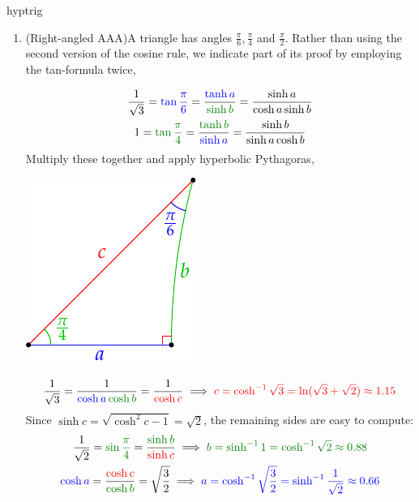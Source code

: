 \begin{examples}{}{hyptrig}
\begin{enumerate}
	 	\item\label{ex:rtangleaaa} (Right-angled AAA)\lstsp A triangle has angles $\frac\pi 6,\frac\pi 4$ and $\frac\pi 2$. Rather than using the second version of the cosine rule, we indicate part of its proof by employing the tan-formula twice,\par
	  \begin{minipage}[t]{0.71\linewidth}\vspace{-12pt}
		  \begin{gather*}
		  	\frac 1{\sqrt 3} =\textcolor{blue}{\tan\frac\pi 6} =\frac{\textcolor{blue}{\tanh a}}{\textcolor{Green}{\sinh b}}=\frac{\sinh a}{\cosh a\sinh b}\\
		  	1=\textcolor{Green}{\tan\frac\pi 4}=\frac{\textcolor{Green}{\tanh b}}{\textcolor{blue}{\sinh a}}=\frac{\sinh b}{\sinh a\cosh b}
		  \end{gather*}
		  Multiply these together and apply hyperbolic Pythagoras,
	  \end{minipage}
	  \hfill
	  \begin{minipage}[t]{0.28\linewidth}\vspace{-20pt}
	  	\flushright\includegraphics[scale=0.95]{isom-right2}
	  \end{minipage}\par\vspace{-12pt}
	  \[
	  	\frac 1{\sqrt 3}=\frac 1{\textcolor{blue}{\cosh a}\,\textcolor{Green}{\cosh b}}=\frac 1{\textcolor{red}{\cosh c}}\implies \textcolor{red}{c=\cosh^{-1}\sqrt 3=\ln(\sqrt 3+\sqrt 2)\approx 1.15}
	  \]
	  Since $\sinh c=\sqrt{\cosh^2c-1}=\sqrt 2$, the remaining sides are easy to compute:
	  \begin{gather*}
		  \frac 1{\sqrt 2}=\textcolor{Green}{\sin\frac\pi 4}=\frac{\textcolor{Green}{\sinh b}}{\textcolor{red}{\sinh c}} \implies \textcolor{Green}{b=\sinh^{-1} 1 =\cosh^{-1}\sqrt 2\approx 0.88}\\
		  \textcolor{blue}{\cosh a} =\frac{\textcolor{red}{\cosh c}}{\textcolor{Green}{\cosh b}}=\sqrt{\frac 32} \implies \textcolor{blue}{a=\cosh^{-1}\sqrt{\frac 32}=\sinh^{-1}\frac 1{\sqrt 2}\approx 0.66}
	  \end{gather*}
	  

\end{enumerate}
\end{examples}
